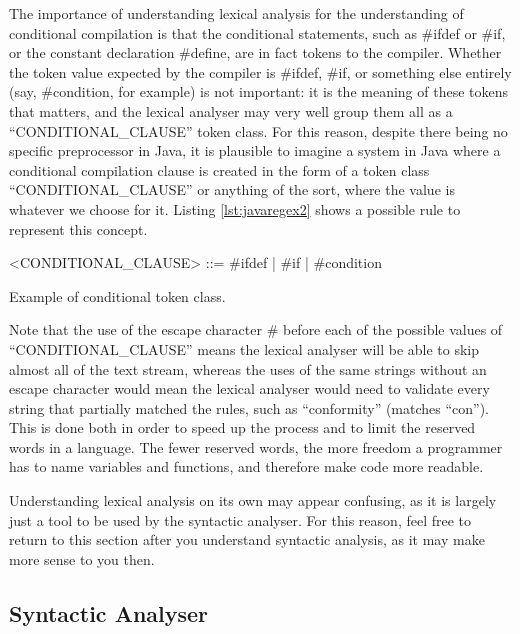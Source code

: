The importance of understanding lexical analysis for the understanding of conditional compilation is that the conditional statements, such as \#ifdef or \#if, or the constant declaration \#define, are in fact tokens to the compiler. Whether the token value expected by the compiler is \#ifdef, \#if, or something else entirely (say, \#condition, for example) is not important: it is the meaning of these tokens that matters, and the lexical analyser may very well group them all as a ``CONDITIONAL_CLAUSE'' token class. For this reason, despite there being no specific preprocessor in Java, it is plausible to imagine a system in Java where a conditional compilation clause is created in the form of a token class ``CONDITIONAL_CLAUSE'' or anything of the sort, where the value is whatever we choose for it. Listing \ref{lst:javaregex2} shows a possible rule to represent this concept.

\begin{listing}
\begin{grammar}
<CONDITIONAL_CLAUSE> ::= \#ifdef | \#if | \#condition
\end{grammar}
\caption{Example of conditional token class.} \label{lst:javaregex2}
\end{listing}

Note that the use of the escape character \# before each of the possible values of ``CONDITIONAL_CLAUSE'' means the lexical analyser will be able to skip almost all of the text stream, whereas the uses of the same strings without an escape character would mean the lexical analyser would need to validate every string that partially matched the rules, such as ``conformity'' (matches ``con''). This is done both in order to speed up the process and to limit the reserved words in a language. The fewer reserved words, the more freedom a programmer has to name variables and functions, and therefore make code more readable.

Understanding lexical analysis on its own may appear confusing, as it is largely just a tool to be used by the syntactic analyser. For this reason, feel free to return to this section after you understand syntactic analysis, as it may make more sense to you then.


\subsection{Syntactic Analyser}

